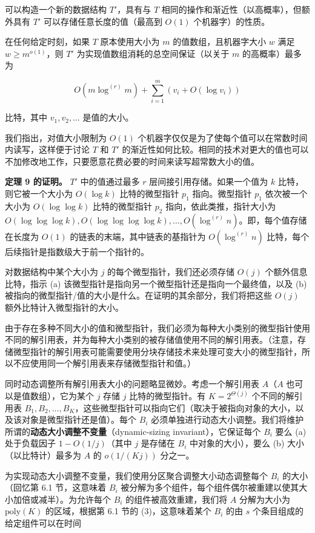\documentclass[12pt,a4paper]{ctexart}
\theoremstyle{remark}
\begin{document}
可以构造一个新的数据结构 $T'$，具有与 $T$ 相同的操作和渐近性（以高概率），但额外具有 $T'$ 可以存储任意长度的值（最高到 $O(1)$ 个机器字）的性质。

在任何给定时刻，如果 $T$ 原本使用大小为 $m$ 的值数组，且机器字大小 $w$ 满足 $w\geq m^{o(1)}$，则 $T'$ 为实现值数组消耗的总空间保证（以关于 $m$ 的高概率）最多为

$$O(m\log^{(r)}m)+\sum_{i=1}^{m}(v_i+O(\log v_i))\tag{4}$$

比特，其中 $v_1,v_2,\ldots$ 是值的大小。

我们指出，对值大小限制为 $O(1)$ 个机器字仅仅是为了使每个值可以在常数时间内读写，这样便于讨论 $T$ 和 $T'$ 的渐近性如何比较。相同的技术对更大的值也可以不加修改地工作，只要愿意花费必要的时间来读写超常数大小的值。

\textbf{定理 9 的证明。} $T'$ 中的值通过最多 $r$ 层间接引用存储。如果一个值为 $k$ 比特，则它被一个大小为 $O(\log k)$ 比特的微型指针 $p_1$ 指向。微型指针 $p_1$ 依次被一个大小为 $O(\log\log k)$ 比特的微型指针 $p_2$ 指向，依此类推，指针大小为 $O(\log\log\log k),O(\log\log\log\log k),\ldots,O(\log^{(r)}n)$。即，每个值存储在长度为 $O(1)$ 的链表的末端，其中链表的基指针为 $O(\log^{(r)}n)$ 比特，每个后续指针是指数级大于前一个指针的。

对数据结构中某个大小为 $j$ 的每个微型指针，我们还必须存储 $O(j)$ 个额外信息比特，指示 (a) 该微型指针是指向另一个微型指针还是指向一个最终值，以及 (b) 被指向的微型指针/值的大小是什么。在证明的其余部分，我们将把这些 $O(j)$ 额外比特计入微型指针的大小。

由于存在多种不同大小的值和微型指针，我们必须为每种大小类别的微型指针使用不同的解引用表，并为每种大小类别的被存储值使用不同的解引用表。（注意，存储微型指针的解引用表可能需要使用分块存储技术来处理可变大小的微型指针，所以不应使用同一个解引用表来存储微型指针和值。）

同时动态调整所有解引用表大小的问题略显微妙。考虑一个解引用表 $A$（$A$ 也可以是值数组），它为某个 $j$ 存储 $j$ 比特的微型指针。有 $K=2^{\Theta(j)}$ 个不同的解引用表 $B_1,B_2,\ldots,B_K$，这些微型指针可以指向它们（取决于被指向对象的大小，以及该对象是微型指针还是值）。每个 $B_i$ 必须单独进行动态大小调整。我们将维护所谓的\textbf{动态大小调整不变量}（dynamic-sizing invariant），它保证每个 $B_i$ 要么 (a) 处于负载因子 $1-O(1/j)$（其中 $j$ 是存储在 $B_i$ 中对象的大小），要么 (b) 大小（以比特计）最多为 $A$ 的 $o(1/(Kj))$ 分之一。

为实现动态大小调整不变量，我们使用分区聚合调整大小动态调整每个 $B_i$ 的大小（回忆第 6.1 节，这意味着 $B_i$ 被分解为多个组件，每个组件偶尔被重建以使其大小加倍或减半）。为允许每个 $B_i$ 的组件被高效重建，我们将 $A$ 分解为大小为 $\text{poly}(K)$ 的区域，根据第 6.1 节的 (3)，这意味着某个 $B_i$ 的由 $s$ 个条目组成的给定组件可以在时间
\end{document}
